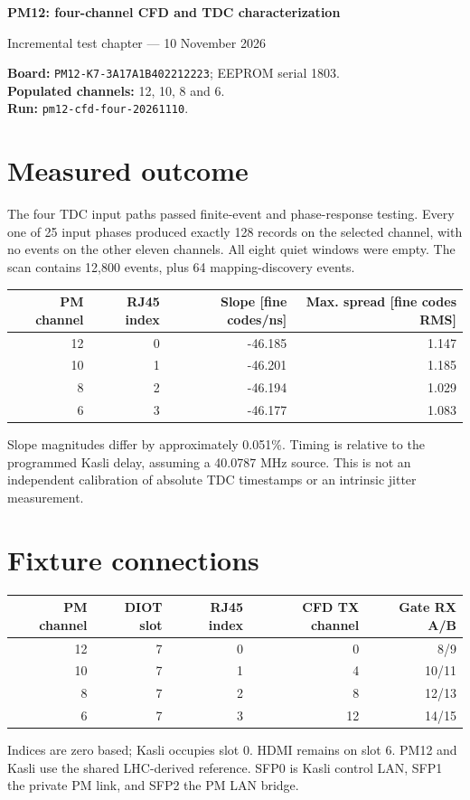 \documentclass[11pt,a4paper]{article}
\begin{document}
{\color{navy}\LARGE\bfseries PM12: four-channel CFD and TDC characterization}\par
{\large Incremental test chapter --- 10 November 2026}\par
\textbf{Board:} \texttt{PM12-K7-3A17A1B402212223}; EEPROM serial 1803.\\
\textbf{Populated channels:} 12, 10, 8 and 6.\\
\textbf{Run:} \texttt{pm12-cfd-four-20261110}.
\section*{Measured outcome}
The four TDC input paths passed finite-event and phase-response testing.
Every one of 25 input phases produced exactly 128 records on the selected
channel, with no events on the other eleven channels. All eight quiet windows
were empty. The scan contains 12,800 events, plus 64 mapping-discovery events.

\begin{center}\begin{tabular}{rrrr}\toprule
PM channel & RJ45 index & Slope [fine codes/ns] & Max. spread [fine codes RMS]\\\midrule
12 & 0 & -46.185 & 1.147 \\
10 & 1 & -46.201 & 1.185 \\
8 & 2 & -46.194 & 1.029 \\
6 & 3 & -46.177 & 1.083 \\
\bottomrule\end{tabular}\end{center}

Slope magnitudes differ by approximately 0.051\%. Timing is relative to the
programmed Kasli delay, assuming a 40.0787 MHz source. This is not an independent
calibration of absolute TDC timestamps or an intrinsic jitter measurement.

\section*{Fixture connections}
\begin{center}\begin{tabular}{rrrrr}\toprule
PM channel & DIOT slot & RJ45 index & CFD TX channel & Gate RX A/B\\\midrule
12 & 7 & 0 & 0 & 8/9\\
10 & 7 & 1 & 4 & 10/11\\
8 & 7 & 2 & 8 & 12/13\\
6 & 7 & 3 & 12 & 14/15\\\bottomrule
\end{tabular}\end{center}
Indices are zero based; Kasli occupies slot 0. HDMI remains on slot 6.
PM12 and Kasli use the shared LHC-derived reference. SFP0 is Kasli control LAN,
SFP1 the private PM link, and SFP2 the PM LAN bridge.
\end{document}
